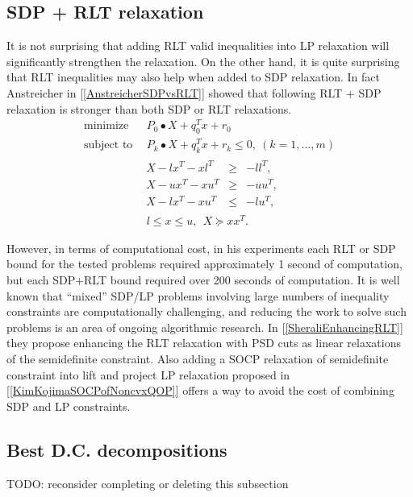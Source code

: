 \documentclass[12pt]{book}
\theoremstyle{definition}
\begin{document}
\subsection{SDP + RLT relaxation}
It is not surprising that adding RLT valid inequalities into LP relaxation will significantly strengthen the relaxation. 
On the other hand, it is quite surprising that RLT inequalities may also help when added to SDP relaxation. 
In fact Anstreicher in [\ref{AnstreicherSDPvsRLT}] showed that following RLT + SDP relaxation is stronger than both SDP or RLT relaxations.
 \begin{equation}
\label{SDP+RLTrelax1} 
\begin{array}{ll}
\mbox{minimize}&\ \ P_0\bullet X + q_0^Tx + r_0\\
\mbox{subject to}&\ \ P_k\bullet X+ q_k^Tx + r_k \leq 0, \  (k = 1,\dots ,m)\\
		& \begin{array}{lcl}
		 X - lx^T - xl^T & \geq & -ll^T, \\
		 X - ux^T - xu^T & \geq & -uu^T, \\
		 X - lx^T - xu^T & \leq & -lu^T, 
		 \end{array}\\
 		&\ \ l\leq x \leq u, \ \  X \succeq xx^T.
\end{array} 
\end{equation}

However, in terms of computational cost, in his experiments each RLT or SDP bound for the tested problems required approximately 1
second of computation, but each SDP+RLT bound required over 200 seconds of computation. It
is well known that “mixed” SDP/LP problems involving large numbers of inequality constraints
are computationally challenging, and reducing the work to solve such problems is an area of ongoing
algorithmic research. In [\ref{SheraliEnhancingRLT}] they propose enhancing the RLT relaxation with PSD cuts as linear relaxations of the semidefinite constraint. Also adding a SOCP relaxation of semidefinite constraint into lift and project LP relaxation proposed in [\ref{KimKojimaSOCPofNoncvxQOP}] offers a way to avoid the cost of combining SDP and LP constraints.

\subsection{Best D.C. decompositions}
TODO: reconsider completing or deleting this subsection
\end{document}
